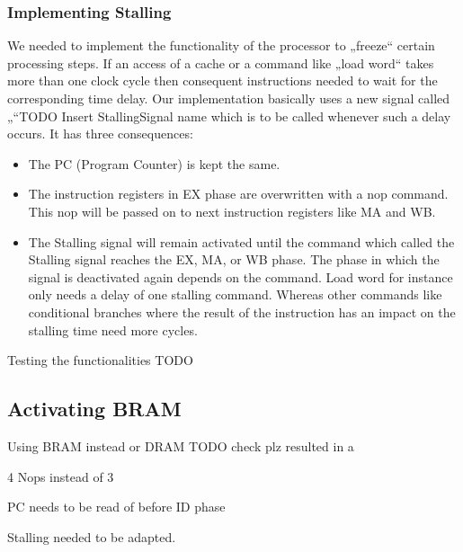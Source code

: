 \subsubsection{Implementing Stalling}
\label{sec:implementingStalling}

We needed to implement the functionality of the processor to „freeze“ certain processing steps. If an access of a cache or a command like „load word“ takes more than one clock cycle then consequent instructions needed to wait for the corresponding time delay. 
Our implementation basically uses a new signal called „“TODO Insert StallingSignal name which is to be called whenever such a delay occurs. It has three consequences:
\begin{itemize} 
	\item The PC (Program Counter) is kept the same.
	\item The instruction registers in EX phase are overwritten with a nop command. This nop will be passed on to next instruction registers like MA and WB.
	\item The Stalling signal will remain activated until the command which called the Stalling signal reaches the EX, MA, or WB phase. The phase in which the signal is deactivated again depends on the command. Load word for instance only needs a delay of one stalling command. Whereas other commands like conditional branches where the result of the instruction has an impact on the stalling time need more cycles.
\end{itemize}

Testing the functionalities TODO

\subsection{Activating BRAM}
\label{sec:activatingBRAM}

Using BRAM instead or DRAM  TODO check plz resulted in a  
	
4 Nops instead of 3

PC needs to be read of before ID phase

Stalling needed to be adapted.

